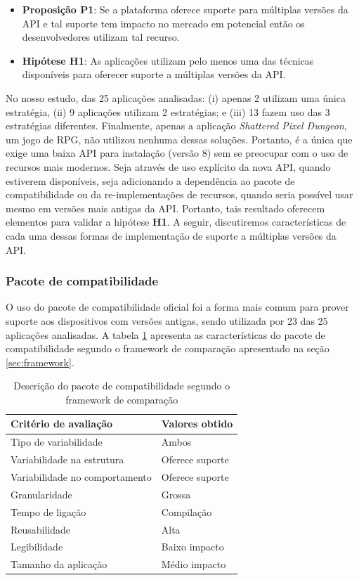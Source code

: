 \begin{itemize}
	\item \textbf{Proposição P1}: Se a plataforma oferece suporte para múltiplas versões
	da API e tal suporte tem impacto no mercado em potencial então os desenvolvedores
	utilizam tal recurso.
	\item \textbf{Hipótese H1}: As aplicações utilizam pelo menos uma das técnicas disponíveis
	para oferecer suporte a múltiplas versões da API.
\end{itemize}

No nosso estudo, das 25 aplicações analisadas: (i) apenas 2 utilizam uma única
estratégia, (ii) 9 aplicações utilizam 2 estratégias; e (iii) 13 fazem uso das
3 estratégias diferentes. Finalmente, apenas a aplicação \textit{Shattered Pixel
Dungeon}, um jogo de RPG, não utilizou nenhuma dessas soluções. Portanto, é a
única que exige uma baixa API para instalação (versão 8) sem se preocupar com
o uso de recursos mais modernos. Seja através de uso explícito da nova API,
quando estiverem disponíveis, seja adicionando a dependência ao pacote de
compatibilidade ou da re-implementações de recursos, quando seria possível usar
mesmo em versões mais antigas da API. Portanto, tais resultado oferecem elementos
para validar a hipótese \textbf{H1}. A seguir, discutiremos características de cada
uma dessas formas de implementação de suporte a múltiplas versões da API.

\subsubsection{Pacote de compatibilidade}
O uso do pacote de compatibilidade oficial foi a forma mais comum para prover
suporte aos dispositivos com versões antigas, sendo utilizada por 23 das 25
aplicações analisadas. A tabela \ref{tab:fw_pacote} apresenta as características
do pacote de compatibilidade segundo o framework de comparação apresentado na
seção \ref{sec:framework}.

\begin{table}[!htbp]
  \centering	
  \caption{Descrição do pacote de compatibilidade segundo o framework de comparação}
  \label{tab:fw_pacote}
  \begin{tabular}{ | l | l |}
    \hline
    \textbf{Critério de avaliação} 	& \textbf{Valores obtido}  \\ \hline
    Tipo de variabilidade 			& Ambos  \\ \hline
    Variabilidade na estrutura 		& Oferece suporte \\ \hline
    Variabilidade no comportamento 	& Oferece suporte \\ \hline
    Granularidade 					& Grossa \\ \hline
    Tempo de ligação 				& Compilação \\ \hline
    Reusabilidade 					& Alta \\ \hline
    Legibilidade 					& Baixo impacto \\ \hline
    Tamanho da aplicação 			& Médio impacto \\ \hline
  \end{tabular}
\end{table}

